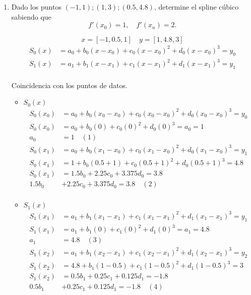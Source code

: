 \documentclass[12pt]{article}
\begin{document}
\begin{enumerate}
    
    \item Dado los puntos \( (-1,1); (1,3); (0.5,4.8) \), determine el spline cúbico sabiendo que 
    \[
    f'(x_0) = 1,\quad f'(x_n) = 2.
    \]

    \[x = [-1,0.5, 1 ] \quad y = [1, 4.8,3]\]
    \[
    \begin{aligned}
        S_0(x) &= a_0 + b_0 (x-x_0) + c_0 (x-x_0)^2 + d_0 (x-x_0)^3 = y_0 \\
        S_1(x) &= a_1 + b_1 (x-x_1) + c_1 (x-x_1)^2 + d_1 (x-x_1)^3 = y_1\\
    \end{aligned}
    \]

Coincidencia con los puntos de datos.

    \begin{itemize}
        \item $S_0(x)$
        \[ 
        \begin{aligned}
            S_0(x_0) &= a_0 + b_0 (x_0-x_0) + c_0 (x_0-x_0)^2 + d_0 (x_0-x_0)^3 = y_0 \\
            S_0(x_0) &= a_0 + b_0 (0) + c_0 (0)^2 + d_0 (0)^3 = a_0 = 1 \\
            a_0 &= 1 \quad (1)\\
            S_0(x_1) &= a_0 + b_0 (x_1-x_0) + c_0 (x_1-x_0)^2 + d_0 (x_1-x_0)^3 = y_1\\
            S_0(x_1) &= 1 + b_0 (0.5 +1) + c_0 (0.5 +1)^2 + d_0 (0.5 +1)^3 = 4.8\\
            S_0(x_1) &= 1.5b_0 + 2.25c_0 + 3.375d_0 = 3.8\\
            1.5b_0& + 2.25c_0 + 3.375d_0 = 3.8 \quad (2)\\
        \end{aligned}
        \]
        \item $S_1(x)$
        \[ 
        \begin{aligned}
            S_1(x_1) &= a_1 + b_1 (x_1-x_1) + c_1 (x_1-x_1)^2 + d_1 (x_1-x_1)^3 = y_1 \\
            S_1(x_1) &= a_1 + b_1 (0) + c_1 (0)^2 + d_1 (0)^3 = a_1 = 4.8 \\
            a_1 &= 4.8 \quad (3)\\
            S_1(x_2) &= a_1 + b_1 (x_2-x_1) + c_1 (x_2-x_1)^2 + d_1 (x_2-x_1)^3 = y_2\\
            S_1(x_2) &= 4.8 + b_1 (1-0.5) + c_1 (1-0.5)^2 + d_1 (1-0.5)^3 = 3\\
            S_1(x_2) &=  0.5 b_1+ 0.25c_1 + 0.125d_1= -1.8\\
            0.5 b_1&+ 0.25c_1 + 0.125d_1= -1.8 \quad (4)\\
        \end{aligned}
        \]
    \end{itemize}


\end{enumerate}
\end{document}

